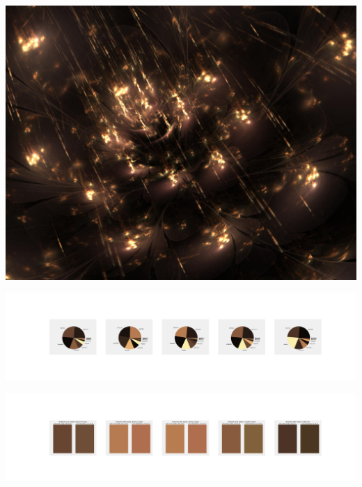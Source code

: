 \documentclass[11pt]{article}
\begin{document}
\begin{landscape}
    \begin{center}
    \includegraphics[width=\textwidth]{./nbimg/file (42).jpg}
    \end{center}

    \begin{center}
    \includegraphics[width=250mm]{./nbimg/pie-356.jpg}
    \end{center}

    \begin{center}
    \includegraphics[width=250mm]{./nbimg/peak-356.jpg}
    \end{center}
    


\end{landscape}
\end{document}
